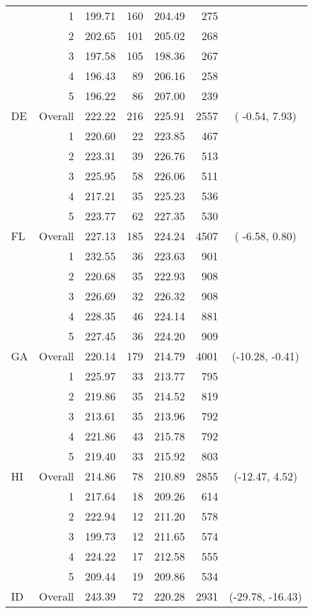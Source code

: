 \begin{longtable}{lrrr@{\extracolsep{.25cm}}rrc}
   & 1 & 199.71 & 160 & 204.49 & 275 &  \\ 
   & 2 & 202.65 & 101 & 205.02 & 268 &  \\ 
   & 3 & 197.58 & 105 & 198.36 & 267 &  \\ 
   & 4 & 196.43 &  89 & 206.16 & 258 &  \\ 
   & 5 & 196.22 &  86 & 207.00 & 239 &  \\ 
   \hline
DE & Overall & 222.22 & 216 & 225.91 & 2557 & ( -0.54,   7.93) \\ 
   & 1 & 220.60 &  22 & 223.85 & 467 &  \\ 
   & 2 & 223.31 &  39 & 226.76 & 513 &  \\ 
   & 3 & 225.95 &  58 & 226.06 & 511 &  \\ 
   & 4 & 217.21 &  35 & 225.23 & 536 &  \\ 
   & 5 & 223.77 &  62 & 227.35 & 530 &  \\ 
   \hline
FL & Overall & 227.13 & 185 & 224.24 & 4507 & ( -6.58,   0.80) \\ 
   & 1 & 232.55 &  36 & 223.63 & 901 &  \\ 
   & 2 & 220.68 &  35 & 222.93 & 908 &  \\ 
   & 3 & 226.69 &  32 & 226.32 & 908 &  \\ 
   & 4 & 228.35 &  46 & 224.14 & 881 &  \\ 
   & 5 & 227.45 &  36 & 224.20 & 909 &  \\ 
   \hline
GA & Overall & 220.14 & 179 & 214.79 & 4001 & (-10.28,  -0.41) \\ 
   & 1 & 225.97 &  33 & 213.77 & 795 &  \\ 
   & 2 & 219.86 &  35 & 214.52 & 819 &  \\ 
   & 3 & 213.61 &  35 & 213.96 & 792 &  \\ 
   & 4 & 221.86 &  43 & 215.78 & 792 &  \\ 
   & 5 & 219.40 &  33 & 215.92 & 803 &  \\ 
   \hline
HI & Overall & 214.86 &  78 & 210.89 & 2855 & (-12.47,   4.52) \\ 
   & 1 & 217.64 &  18 & 209.26 & 614 &  \\ 
   & 2 & 222.94 &  12 & 211.20 & 578 &  \\ 
   & 3 & 199.73 &  12 & 211.65 & 574 &  \\ 
   & 4 & 224.22 &  17 & 212.58 & 555 &  \\ 
   & 5 & 209.44 &  19 & 209.86 & 534 &  \\ 
   \hline
ID & Overall & 243.39 &  72 & 220.28 & 2931 & (-29.78, -16.43) \\ 

\end{longtable}
